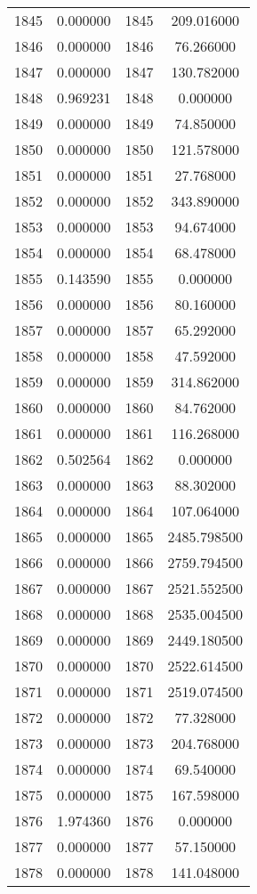 \documentclass[12pt]{article}
\begin{document}
\begin{longtable}{@{}cccc@{}}
1845 & 0.000000 & 1845 & 209.016000 \\
1846 & 0.000000 & 1846 & 76.266000 \\
1847 & 0.000000 & 1847 & 130.782000 \\
1848 & 0.969231 & 1848 & 0.000000 \\
1849 & 0.000000 & 1849 & 74.850000 \\
1850 & 0.000000 & 1850 & 121.578000 \\
1851 & 0.000000 & 1851 & 27.768000 \\
1852 & 0.000000 & 1852 & 343.890000 \\
1853 & 0.000000 & 1853 & 94.674000 \\
1854 & 0.000000 & 1854 & 68.478000 \\
1855 & 0.143590 & 1855 & 0.000000 \\
1856 & 0.000000 & 1856 & 80.160000 \\
1857 & 0.000000 & 1857 & 65.292000 \\
1858 & 0.000000 & 1858 & 47.592000 \\
1859 & 0.000000 & 1859 & 314.862000 \\
1860 & 0.000000 & 1860 & 84.762000 \\
1861 & 0.000000 & 1861 & 116.268000 \\
1862 & 0.502564 & 1862 & 0.000000 \\
1863 & 0.000000 & 1863 & 88.302000 \\
1864 & 0.000000 & 1864 & 107.064000 \\
1865 & 0.000000 & 1865 & 2485.798500 \\
1866 & 0.000000 & 1866 & 2759.794500 \\
1867 & 0.000000 & 1867 & 2521.552500 \\
1868 & 0.000000 & 1868 & 2535.004500 \\
1869 & 0.000000 & 1869 & 2449.180500 \\
1870 & 0.000000 & 1870 & 2522.614500 \\
1871 & 0.000000 & 1871 & 2519.074500 \\
1872 & 0.000000 & 1872 & 77.328000 \\
1873 & 0.000000 & 1873 & 204.768000 \\
1874 & 0.000000 & 1874 & 69.540000 \\
1875 & 0.000000 & 1875 & 167.598000 \\
1876 & 1.974360 & 1876 & 0.000000 \\
1877 & 0.000000 & 1877 & 57.150000 \\
1878 & 0.000000 & 1878 & 141.048000 \\

\end{longtable}
\end{document}
